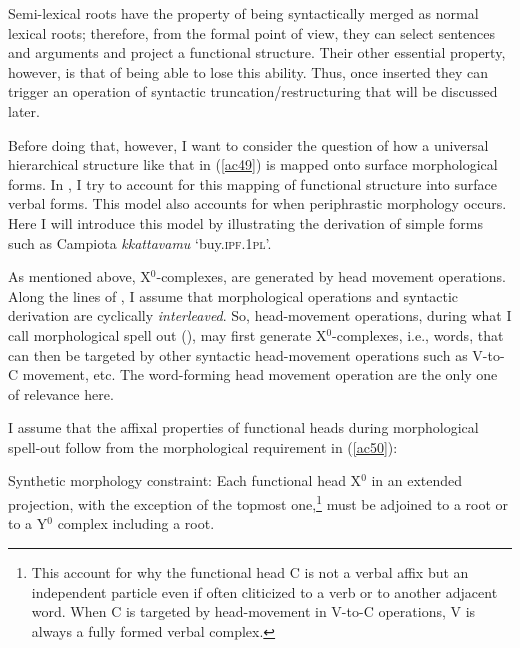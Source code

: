 \documentclass[output=paper]{langscibook}
\begin{document}
Semi-lexical roots have the property of being syntactically merged as normal lexical roots; therefore, from the formal point of view, they can select sentences and arguments and project a functional structure.  Their other essential property, however, is that of being able to lose this ability. Thus, once inserted they can trigger an operation of syntactic truncation\slash restructuring that will be discussed later.

Before doing that, however, I want to consider  the question of how a universal hierarchical structure like that in (\ref{ac49}) is mapped onto surface morphological forms. In \citet{calabrese2019a}, I try to account for this mapping of functional structure into surface verbal forms. This model also accounts for when periphrastic morphology occurs. Here I will introduce this model by illustrating the derivation of simple forms such as Campiota \textit{kkattavamu} ‘buy.\textsc{ipf}.\textsc{1pl}’.

As mentioned above, X$^0$-complexes, are generated by head movement operations. Along the lines of \citet{calabrese2014a}, I assume that morphological operations and syntactic derivation are cyclically \textit{interleaved}. So, head-movement operations, during what I call morphological spell out (\citealt{calabrese2019a}), may first generate X$^0$-complexes, i.e., words, that can then be targeted by other syntactic head-movement operations such as V-to-C movement, etc. The word-forming head movement operation are the only one of relevance here.

I assume that the affixal properties of functional heads during morphological spell-out follow from the morphological requirement in (\ref{ac50}):

\ea \label{ac50}Synthetic morphology constraint:
Each functional head X$^0$ in an extended projection, with the exception of the topmost one,\footnote{This account for why the functional head C is not a verbal affix but an independent particle even if often cliticized to a verb or to another adjacent word.  When C is targeted by head-movement in V-to-C operations, V is always a fully formed verbal complex.} must be adjoined to a root or to a Y$^0$ complex including a root.
\z
\end{document}
